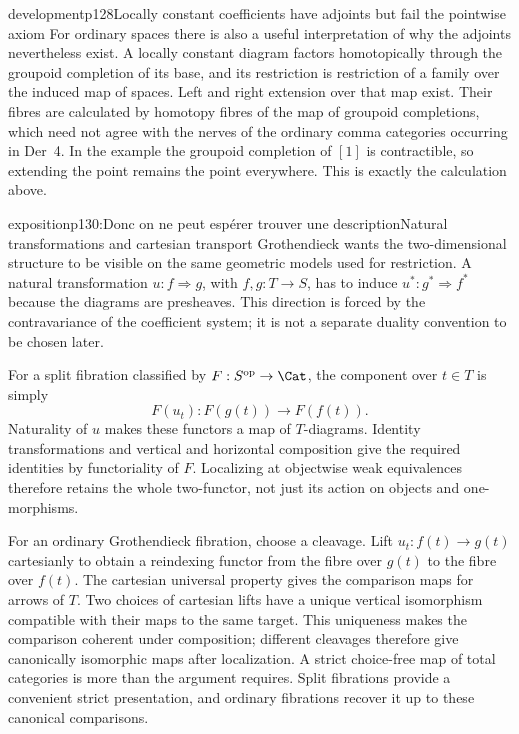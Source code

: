 \begin{dcomment}{development}{p128}{Locally constant coefficients have adjoints but fail the pointwise axiom}
For ordinary spaces there is also a useful interpretation of why the adjoints nevertheless exist. A locally constant diagram factors homotopically through the groupoid completion of its base, and its restriction is restriction of a family over the induced map of spaces. Left and right extension over that map exist. Their fibres are calculated by homotopy fibres of the map of groupoid completions, which need not agree with the nerves of the ordinary comma categories occurring in Der~4. In the example the groupoid completion of $[1]$ is contractible, so extending the point remains the point everywhere. This is exactly the calculation above.
\end{dcomment}

\begin{dcomment}{exposition}{p130:Donc on ne peut espérer trouver une description}{Natural transformations and cartesian transport}
Grothendieck wants the two-dimensional structure to be visible on the same geometric models used for restriction. A natural transformation $u:f\Rightarrow g$, with $f,g:T\to S$, has to induce $u^*:g^*\Rightarrow f^*$ because the diagrams are presheaves. This direction is forced by the contravariance of the coefficient system; it is not a separate duality convention to be chosen later.

For a split fibration classified by $F:S^{\mathrm{op}}\to\Cat$, the component over $t\in T$ is simply
\[
 F(u_t):F(g(t))\longrightarrow F(f(t)).
\]
Naturality of $u$ makes these functors a map of $T$-diagrams. Identity transformations and vertical and horizontal composition give the required identities by functoriality of $F$. Localizing at objectwise weak equivalences therefore retains the whole two-functor, not just its action on objects and one-morphisms.

For an ordinary Grothendieck fibration, choose a cleavage. Lift $u_t:f(t)\to g(t)$ cartesianly to obtain a reindexing functor from the fibre over $g(t)$ to the fibre over $f(t)$. The cartesian universal property gives the comparison maps for arrows of $T$. Two choices of cartesian lifts have a unique vertical isomorphism compatible with their maps to the same target. This uniqueness makes the comparison coherent under composition; different cleavages therefore give canonically isomorphic maps after localization. A strict choice-free map of total categories is more than the argument requires. Split fibrations provide a convenient strict presentation, and ordinary fibrations recover it up to these canonical comparisons.


\end{dcomment}

